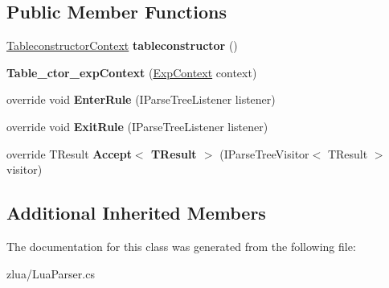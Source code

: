 \subsection*{Public Member Functions}
\begin{DoxyCompactItemize}
\item 
\mbox{\label{classzlua_1_1_lua_parser_1_1_table__ctor__exp_context_a332498d6db41aa7f2cc476dc91861b9e}} 
\mbox{\hyperlink{classzlua_1_1_lua_parser_1_1_tableconstructor_context}{Tableconstructor\+Context}} {\bfseries tableconstructor} ()
\item 
\mbox{\label{classzlua_1_1_lua_parser_1_1_table__ctor__exp_context_a1b41fd02a6475a28133c3159b551a200}} 
{\bfseries Table\+\_\+ctor\+\_\+exp\+Context} (\mbox{\hyperlink{classzlua_1_1_lua_parser_1_1_exp_context}{Exp\+Context}} context)
\item 
\mbox{\label{classzlua_1_1_lua_parser_1_1_table__ctor__exp_context_acbf0f163baeacf8f76566c03f196e2fb}} 
override void {\bfseries Enter\+Rule} (I\+Parse\+Tree\+Listener listener)
\item 
\mbox{\label{classzlua_1_1_lua_parser_1_1_table__ctor__exp_context_ad7b884faa0cd51e00cca94e53f77c63a}} 
override void {\bfseries Exit\+Rule} (I\+Parse\+Tree\+Listener listener)
\item 
\mbox{\label{classzlua_1_1_lua_parser_1_1_table__ctor__exp_context_a0914d0cb1fa9d0859d9b66a1d6ac3037}} 
override T\+Result {\bfseries Accept$<$ T\+Result $>$} (I\+Parse\+Tree\+Visitor$<$ T\+Result $>$ visitor)
\end{DoxyCompactItemize}
\subsection*{Additional Inherited Members}


The documentation for this class was generated from the following file\+:\begin{DoxyCompactItemize}
\item 
zlua/Lua\+Parser.\+cs\end{DoxyCompactItemize}
